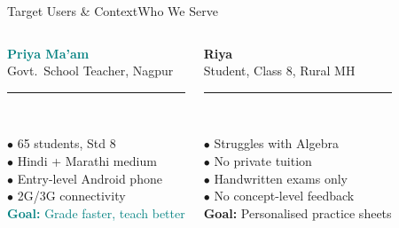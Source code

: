 \documentclass[aspectratio=169,10pt]{beamer}
\begin{document}
\begin{frame}[t,shrink=5]{Target Users \& Context}{Who We Serve}
\begin{columns}[T]

\vspace{4pt}
\colorbox{card}{\parbox{0.92\linewidth}{%
  \vspace{4pt}\centering
  \textcolor{teal}{\large\textbf{Priya Ma'am}}\\
  \textcolor{txtsec}{\scriptsize Govt.\ School Teacher, Nagpur}\\[4pt]
  \textcolor{cardbdr}{\rule{0.8\linewidth}{0.3pt}}\\[4pt]
  \raggedright
  \textcolor{txtsec}{\scriptsize$\bullet$} \textcolor{txt}{\scriptsize 65 students, Std 8}\\[2pt]
  \textcolor{txtsec}{\scriptsize$\bullet$} \textcolor{txt}{\scriptsize Hindi + Marathi medium}\\[2pt]
  \textcolor{txtsec}{\scriptsize$\bullet$} \textcolor{txt}{\scriptsize Entry-level Android phone}\\[2pt]
  \textcolor{txtsec}{\scriptsize$\bullet$} \textcolor{txt}{\scriptsize 2G/3G connectivity}\\[4pt]
  \textcolor{teal}{\scriptsize\textbf{Goal:} Grade faster, teach better}\\[4pt]
}}

\vspace{4pt}
\colorbox{card}{\parbox{0.92\linewidth}{%
  \vspace{4pt}\centering
  \textcolor{orng}{\large\textbf{Riya}}\\
  \textcolor{txtsec}{\scriptsize Student, Class 8, Rural MH}\\[4pt]
  \textcolor{cardbdr}{\rule{0.8\linewidth}{0.3pt}}\\[4pt]
  \raggedright
  \textcolor{txtsec}{\scriptsize$\bullet$} \textcolor{txt}{\scriptsize Struggles with Algebra}\\[2pt]
  \textcolor{txtsec}{\scriptsize$\bullet$} \textcolor{txt}{\scriptsize No private tuition}\\[2pt]
  \textcolor{txtsec}{\scriptsize$\bullet$} \textcolor{txt}{\scriptsize Handwritten exams only}\\[2pt]
  \textcolor{txtsec}{\scriptsize$\bullet$} \textcolor{txt}{\scriptsize No concept-level feedback}\\[4pt]
  \textcolor{orng}{\scriptsize\textbf{Goal:} Personalised practice sheets}\\[4pt]
}}


\end{columns}
\end{frame}
\end{document}
